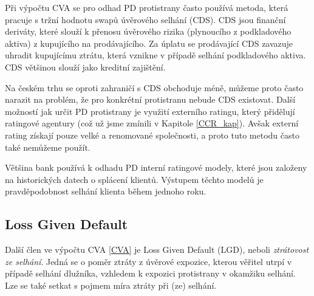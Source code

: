 \documentclass[a4paper,12pt]{report}
\theoremstyle{definition} \newtheorem{definice}[veta]{Definice}
\theoremstyle{remark}
\begin{document}
Při výpočtu CVA se pro odhad PD protistrany často používá metoda, která pracuje s tržní hodnotu swapů úvěrového selhání (CDS).
CDS jsou finanční deriváty, které slouží k přenosu úvěrového rizika (plynoucího z podkladového aktiva) z kupujícího na prodávajícího.
Za úplatu se prodávající CDS zavazuje uhradit kupujícímu ztrátu, která vznikne v případě selhání podkladového aktiva.
CDS většinou slouží jako kreditní zajištění.

Na českém trhu se oproti zahraničí s CDS obchoduje méně, můžeme proto často narazit na problém, že pro konkrétní protistranu nebude CDS existovat.
Další možností jak určit PD protistrany je využití externího ratingu, který přidělují ratingové agentury (což už jsme zmínili v Kapitole \ref{CCR_kap}).
Avšak externí rating získají pouze velké a renomované společnosti, a proto tuto metodu často také nemůžeme použít.

Většina bank používá k odhadu PD interní ratingové modely, které jsou založeny na historických datech o splácení klientů.
Výstupem těchto modelů je pravděpodobnost selhání klienta během jednoho roku.
 




\subsection{Loss Given Default}
Další člen ve výpočtu CVA \eqref{CVA} je Loss Given Default (LGD), neboli \textit{ztrátovost ze selhání}.
Jedná se o poměr ztráty z úvěrové expozice, kterou věřitel utrpí v případě selhání dlužníka, vzhledem k expozici protistrany v okamžiku selhání. 
Lze se také setkat s pojmem míra ztráty při (ze) selhání.
\end{document}
